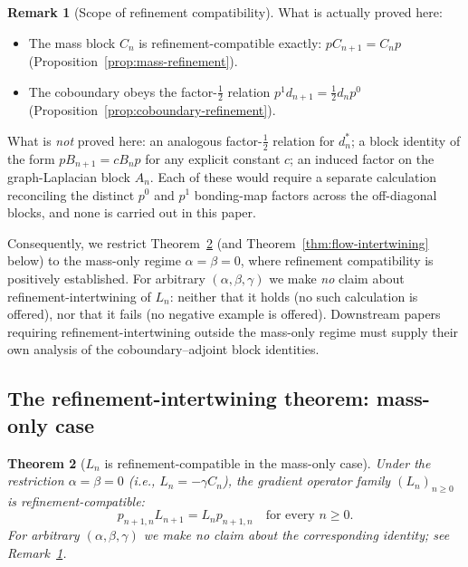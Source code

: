 \documentclass[11pt, a4paper]{amsart}
\newtheorem{theorem}{Theorem}[section]
\theoremstyle{definition}
\newtheorem{remark}[theorem]{Remark}
\begin{document}
\begin{remark}[Scope of refinement compatibility]
\label{rmk:refinement-compat-scope}
What is actually proved here:
\begin{itemize}
\item The mass block $C_n$ is refinement-compatible exactly:
  $p C_{n+1} = C_n p$ (Proposition~\ref{prop:mass-refinement}).
\item The coboundary obeys the factor-$\tfrac{1}{2}$ relation
  $p^1 d_{n+1} = \tfrac{1}{2} d_n p^0$
  (Proposition~\ref{prop:coboundary-refinement}).
\end{itemize}
What is \emph{not} proved here: an analogous factor-$\tfrac{1}{2}$
relation for $d_n^*$; a block identity of the form $p B_{n+1} = c
B_n p$ for any explicit constant $c$; an induced factor on the
graph-Laplacian block $A_n$. Each of these would require a separate
calculation reconciling the distinct $p^0$ and $p^1$ bonding-map
factors across the off-diagonal blocks, and none is carried out in
this paper.

Consequently, we restrict Theorem~\ref{thm:refinement-compat}
(and Theorem~\ref{thm:flow-intertwining} below) to the mass-only
regime $\alpha = \beta = 0$, where refinement compatibility is
positively established. For arbitrary $(\alpha, \beta, \gamma)$ we
make \emph{no} claim about refinement-intertwining of $L_n$: neither
that it holds (no such calculation is offered), nor that it fails
(no negative example is offered). Downstream papers requiring
refinement-intertwining outside the mass-only regime must supply
their own analysis of the coboundary--adjoint block identities.
\end{remark}

\subsection{The refinement-intertwining theorem: mass-only case}

\begin{theorem}[$L_n$ is refinement-compatible in the mass-only case]
\label{thm:refinement-compat}
Under the restriction $\alpha = \beta = 0$ (i.e., $L_n = -\gamma
C_n$), the gradient operator family $(L_n)_{n \geq 0}$ is
refinement-compatible:
\[
  p_{n+1, n} L_{n+1} = L_n p_{n+1, n}
  \quad \text{for every } n \geq 0.
\]
For arbitrary $(\alpha, \beta, \gamma)$ we make no claim about the
corresponding identity; see
Remark~\ref{rmk:refinement-compat-scope}.
\end{theorem}
\end{document}
